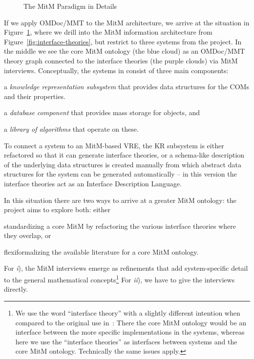 \begin{figure}[ht]\centering
  
  \caption{The MitM Paradigm in Details}\label{fig:mitm}
\end{figure}
If we apply OMDoc/MMT to the MitM architecture, we arrive at the situation in
Figure~\ref{fig:mitm}, where we drill into the MitM information architecture from
Figure~\ref{fig:interface-theories}, but restrict to three systems from the \ODK
project. In the middle we see the core MitM ontology (the blue cloud) as an OMDoc/MMT
theory graph connected to the interface theories (the purple clouds) via MitM
interviews. Conceptually, the systems in \ODK consist of three main components:
\begin{inparaenum}[\em i\rm)]
\item a \emph{knowledge representation subsystem} that provides data structures for the COMs and
  their properties.
\item a \emph{database component} that provides mass storage for objects, and 
\item a \emph{library of algorithms} that operate on these.
\end{inparaenum}
To connect a system to an MitM-based VRE, the KR subsystem is either refactored so that it
can generate interface theories, or a schema-like description of the underlying data
structures is created manually from which abstract data structures for the system can be
generated automatically -- in this version the interface theories act as an Interface
Description Language.

In this situation there are two ways to arrive at a greater MitM ontology: the \ODK
project aims to explore both: either
\begin{inparaenum}[\em i\rm)] 
\item standardizing a core MitM by refactoring the various interface theories where they
  overlap, or
\item flexiformalizing the available literature for a core MitM ontology.
\end{inparaenum}
For \emph{i}), the MitM interviews emerge as refinements that add system-specific detail
to the general mathematical concepts\footnote{We use the word ``interface theory'' with a
  slightly different intention when compared to the original use
  in~\cite{KohRabSac:fvip11}: There the core MitM ontology would be an interface between
  the more specific implementations in the systems, whereas here we use the ``interface
  theories'' as interfaces between systems and the core MitM ontology. Technically the
  same issues apply.} For \emph{ii}), we have to give the interviews directly. 

